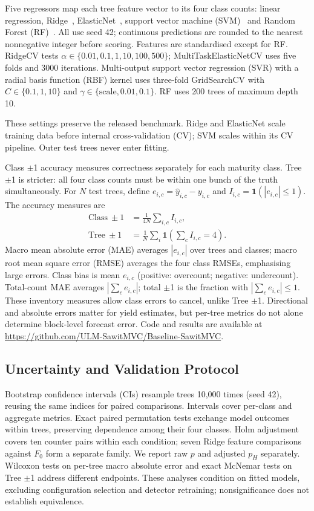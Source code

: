 \documentclass[conference,a4paper]{IEEEtran}
\begin{document}
Five regressors map each tree feature vector to its four class counts: linear regression, Ridge~\cite{ref19},
ElasticNet~\cite{ref17}, support vector machine (SVM)~\cite{ref20} and Random Forest (RF)~\cite{ref18}.
All use seed 42; continuous predictions are rounded to the nearest
nonnegative integer before scoring. Features are
standardised except for RF. RidgeCV tests
$\alpha\in\{0.01,0.1,1,10,100,500\}$; MultiTaskElasticNetCV uses five folds and
3000 iterations. Multi-output support vector regression (SVR) with a radial basis function (RBF) kernel uses three-fold GridSearchCV with
$C\in\{0.1,1,10\}$ and $\gamma\in\{\mathrm{scale},0.01,0.1\}$.
RF uses 200 trees of maximum depth 10.

These settings preserve the released benchmark.
Ridge and ElasticNet scale training data before internal cross-validation (CV); SVM scales within its
CV pipeline. Outer test trees never enter fitting.

Class $\pm$1 accuracy measures correctness separately for each maturity class.
Tree $\pm$1 is stricter: all four class counts must be within one bunch of
the truth simultaneously. For $N$ test trees, define $e_{i,c}=\hat y_{i,c}-y_{i,c}$ and
$I_{i,c}=\mathbf1(|e_{i,c}|\leq1)$. The accuracy measures are
\begin{align}
\mathrm{Class}\ \pm1&=\frac{1}{4N}\sum_{i,c}I_{i,c},\\
\mathrm{Tree}\ \pm1&=\frac{1}{N}\sum_i\mathbf1\!\left(\sum_c I_{i,c}=4\right).
\end{align}
Macro mean absolute error (MAE) averages $|e_{i,c}|$ over trees and classes; macro root mean square error (RMSE) averages
the four class RMSEs, emphasising large errors. Class bias is mean $e_{i,c}$
(positive: overcount; negative: undercount). Total-count MAE averages
$|\sum_c e_{i,c}|$; total $\pm$1 is the fraction with $|\sum_c e_{i,c}|\leq1$.
These inventory measures allow class errors to cancel, unlike Tree $\pm$1.
Directional and absolute errors matter for yield estimates, but per-tree
metrics do not alone determine block-level forecast error. Code and results
are available at \url{https://github.com/ULM-SawitMVC/Baseline-SawitMVC}.

\subsection{Uncertainty and Validation Protocol}
\label{sec:stats}

Bootstrap confidence intervals (CIs) resample trees 10,000 times (seed 42), reusing
the same indices for paired comparisons. Intervals cover per-class and aggregate
metrics. Exact paired permutation tests exchange model outcomes within trees,
preserving dependence among their four classes. Holm adjustment covers ten
counter pairs within each condition; seven Ridge feature comparisons against
$F_0$ form a separate family. We report raw $p$ and adjusted $p_H$ separately.
Wilcoxon tests on per-tree macro absolute error and exact McNemar tests on Tree
$\pm$1 address different endpoints. These analyses condition on fitted models,
excluding configuration selection and detector retraining; nonsignificance
does not establish equivalence.
\end{document}
